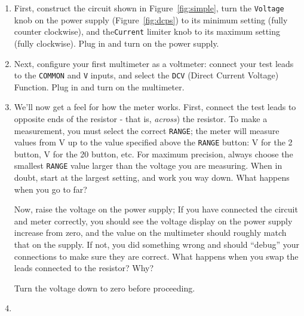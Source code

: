 \documentclass[12pt]{article}
\begin{document}
\begin{enumerate}
\item First, construct the circuit shown in Figure~\ref{fig:simple},
  turn the \texttt{Voltage} knob on the power supply
  (Figure~\ref{fig:dcps}) to its minimum setting (fully counter
  clockwise), and the\texttt{Current} limiter knob to its maximum
  setting (fully clockwise).  Plug in and turn on the power supply.
\item Next, configure your first multimeter as a voltmeter: connect
  your test leads to the \texttt{COMMON} and \texttt{V} inputs, and
  select the \texttt{DCV} (Direct Current Voltage) Function.  Plug in
  and turn on the multimeter.
\item We'll now get a feel for how the meter works.  First, connect
  the test leads to opposite ends of the resistor - that is,
  \textit{across}) the resistor.  To make a measurement, you must
  select the correct \texttt{RANGE}; the meter will measure values
  from \unit[0]{V} up to the value specified above the \texttt{RANGE}
  button: \unit[2]{V} for the 2 button, \unit[20]{V} for the 20
  button, etc.  For maximum precision, always choose the smallest
  \texttt{RANGE} value larger than the voltage you are measuring.
  When in doubt, start at the largest setting, and work you way down.
  What happens when you go to far?

  Now, raise the voltage on the power supply; If you have connected
  the circuit and meter correctly, you should see the voltage display
  on the power supply increase from zero, and the value on the
  multimeter should roughly match that on the supply.  If not, you did
  something wrong and should ``debug'' your connections to make sure
  they are correct.  What happens when you swap the leads connected to
  the resistor?  Why?

  Turn the voltage down to zero before proceeding.
\item 
{}
  \begin{figure}
    \centering
    

\end{figure}
\end{enumerate}
\end{document}
